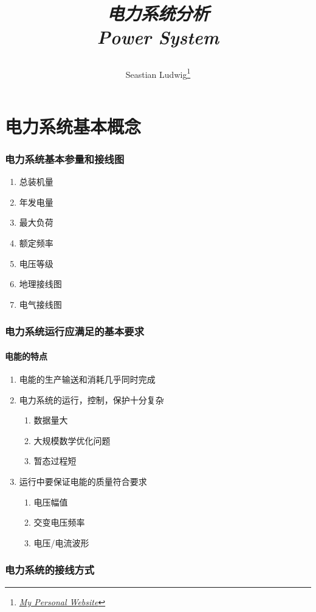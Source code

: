 \documentclass[10pt]{ctexart}
\title{\begin{center}{\Huge \textit{电力系统分析}}\\{{\itshape Power System}}\end{center}}
\author{Seastian Ludwig\footnote{\href{https://geodesick.com/}{\textit{My Personal Website}}}}
\affiliation{
   University of Northeast Electronic Power University\\
Electronic Engineer school\\
}
\begin{document}
\maketitle
\flushbottom
\newpage
\pagestyle{fancynotes}

\part{电力系统基本概念}
\section{电力系统基本参量和接线图}
\begin{enumerate}
    \item 总装机量
    \item 年发电量
    \item 最大负荷
    \item 额定频率
    \item 电压等级
    \item 地理接线图
    \item 电气接线图
\end{enumerate}
\section{电力系统运行应满足的基本要求}
\subsection{电能的特点}
\begin{enumerate}
    \item 电能的生产输送和消耗几乎同时完成
    \item 电力系统的运行，控制，保护十分复杂
    \begin{enumerate}
        \item 数据量大
        \item 大规模数学优化问题
        \item 暂态过程短
    \end{enumerate}
    \item 运行中要保证电能的质量符合要求
    \begin{enumerate}
        \item 电压幅值
        \item 交变电压频率
        \item 电压/电流波形
    \end{enumerate}
\end{enumerate}
\section{电力系统的接线方式}
\newpage
\end{document}
